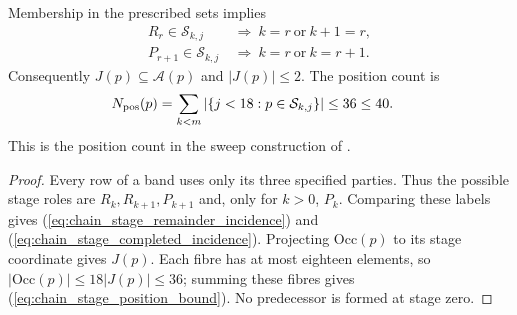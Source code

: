 \begin{lemma}
    \label{thm:chain_stage_incidence}
    \leanok
    Membership in the prescribed sets implies
    \begin{align}
        R_r\in\mathcal S_{k,j}     & \ \Longrightarrow\ k=r\ \text{or}\ k+1=r,
        \label{eq:chain_stage_remainder_incidence}                             \\
        P_{r+1}\in\mathcal S_{k,j} & \ \Longrightarrow\ k=r\ \text{or}\ k=r+1.
        \label{eq:chain_stage_completed_incidence}
    \end{align}
    Consequently $J(p)\subseteq\mathcal A(p)$ and $|J(p)|\le2$. The position count is
    \begin{align}
        N_{\rm pos}(p)
         & =\sum_{k<m}|\{j<18:p\in\mathcal S_{k,j}\}|\le36\le40.
        \label{eq:chain_stage_position_bound}
    \end{align}
    This is the position count in the sweep construction of
    \cite[Part~II]{TNLean2026OneDimensional}.
\end{lemma}
\begin{proof}\leanok
    Every row of a band uses only its three specified parties. Thus the
    possible stage roles are $R_k,R_{k+1},P_{k+1}$ and, only for $k>0$,
    $P_k$. Comparing these labels gives
    (\ref{eq:chain_stage_remainder_incidence}) and
    (\ref{eq:chain_stage_completed_incidence}). Projecting
    $\mathrm{Occ}(p)$ to its stage coordinate gives $J(p)$.
    Each fibre has at most eighteen elements, so
    $|\mathrm{Occ}(p)|\le18|J(p)|\le36$; summing these fibres gives
    (\ref{eq:chain_stage_position_bound}). No predecessor is formed at stage zero.
\end{proof}

